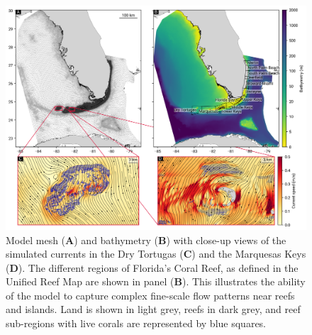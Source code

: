 \documentclass[preprint,12pt,authoryear]{elsarticle}
\begin{document}
\begin{figure}
    \centering
    \includegraphics[width=\textwidth]{figures/fig_mesh_tnc.png}
    \caption{Model mesh (\textbf{A}) and bathymetry (\textbf{B}) with close-up views of the simulated currents in the Dry Tortugas (\textbf{C}) and the Marquesas Keys (\textbf{D}). The different regions of Florida's Coral Reef, as defined in the Unified Reef Map are shown in panel (\textbf{B}). This illustrates the ability of the model to capture complex fine-scale flow patterns near reefs and islands. Land is shown in light grey, reefs in dark grey, and reef sub-regions with live corals are represented by blue squares.}
    \label{fig:mesh}
\end{figure}
\end{document}
